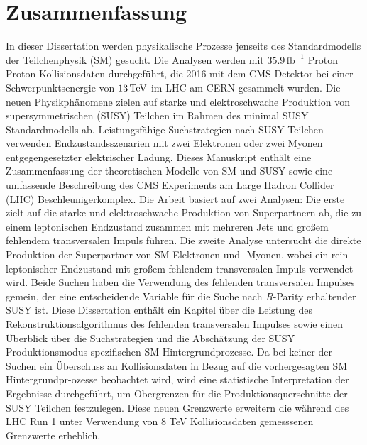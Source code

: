 \chapter*{Zusammenfassung}
\noindent
\justify
In dieser Dissertation werden physikalische Prozesse jenseits des Standardmodells der Teilchenphysik (SM) gesucht. 
Die Analysen werden mit $35.9\,\mathrm{fb^{-1}}$ Proton Proton Kollisionsdaten durchgef\"{u}hrt, die 2016 mit dem CMS Detektor bei einer Schwerpunktsenergie von $13\,\text{Te\hspace{-.08em}V}$ im LHC am CERN gesammelt wurden. 
Die neuen Physikph\"{a}nomene zielen auf starke und elektroschwache Produktion von supersymmetrischen (SUSY) Teilchen im Rahmen des minimal SUSY Standardmodells ab. 
Leistungsf\"{a}hige Suchstrategien nach SUSY Teilchen verwenden Endzustandsszenarien mit zwei Elektronen oder zwei Myonen entgegengesetzter elektrischer Ladung. 
\newpara
\noindent\justify
Dieses Manuskript enth\"{a}lt eine Zusammenfassung der theoretischen Modelle von SM und SUSY sowie eine umfassende Beschreibung des CMS Experiments am Large Hadron Collider (LHC) Beschleunigerkomplex. 
Die Arbeit basiert auf zwei Analysen: Die erste zielt auf die starke und elektroschwache Produktion von Superpartnern ab, die zu einem leptonischen Endzustand zusammen mit mehreren Jets und gro{\ss}em fehlendem transversalen Impuls f\"{u}hren. 
Die zweite Analyse untersucht die direkte Produktion der Superpartner von SM-Elektronen und -Myonen, wobei ein rein leptonischer Endzustand mit gro{\ss}em fehlendem transversalen Impuls verwendet wird.
Beide Suchen haben die Verwendung des fehlenden transversalen Impulses gemein, der eine entscheidende Variable f\"{u}r die Suche nach $R$-Parity erhaltender SUSY ist. 
\newpara
\noindent\justify
Diese Dissertation enth\"{a}lt ein Kapitel \"{u}ber die Leistung des Rekonstruktionsalgorithmus des fehlenden transversalen Impulses sowie einen \"{U}berblick \"{u}ber die Suchstrategien und die Absch\"{a}tzung der SUSY Produktionsmodus spezifischen SM Hintergrundprozesse.
\newpara
\noindent\justify
Da bei keiner der Suchen ein \"{U}berschuss an Kollisionsdaten in Bezug auf die vorhergesagten SM Hintergrundpr-\newline ozesse beobachtet wird, wird eine statistische Interpretation der Ergebnisse durchgef\"{u}hrt, um Obergrenzen f\"{u}r die Produktionsquerschnitte der SUSY Teilchen festzulegen. 
Diese neuen Grenzwerte erweitern die w\"{a}hrend des LHC Run 1 unter Verwendung von 8 TeV Kollisionsdaten gemesssenen Grenzwerte erheblich. 
